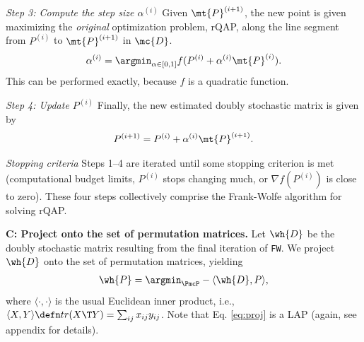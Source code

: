 \documentclass[11pt]{article}
\begin{document}

\emph{Step 3: Compute the step size $\alpha^{(i)}$} Given $\mt{P}^{(i+1)}$, the new point is given maximizing the \emph{original} optimization problem, rQAP, along the line segment from $P^{(i)}$ to $\mt{P}^{(i+1)}$ in $\mc{D}$.    
% 
% 
% 
\begin{align}\label{eq:step}
	\alpha^{(i)} = \argmin_{\alpha \in [0,1]} f(P^{(i)} + \alpha^{(i)} \mt{P}^{(i)}).
\end{align}
This can be performed exactly, because $f$ is a quadratic function.  


\emph{Step 4: Update $P^{(i)}$} Finally, the new estimated doubly stochastic matrix is given by
\begin{align}\label{eq:update}
	P^{(i+1)} = P^{(i)} + \alpha^{(i)} \mt{P}^{(i+1)}.
\end{align}


\emph{Stopping criteria} Steps 1--4 are iterated until some stopping criterion is met (computational budget limits, $P^{(i)}$ stops changing much, or $\nabla f(P^{(i)})$ is close to zero).  These four steps collectively comprise the Frank-Wolfe algorithm for solving rQAP.  %


\textbf{C: Project onto the set of permutation matrices.}   Let $\wh{D}$ be the doubly stochastic matrix resulting from the final iteration of \texttt{FW}.  We project $\wh{D}$ onto the set of permutation matrices, yielding
\begin{align} \label{eq:proj}
	\wh{P} = \argmin_{\PmcP} -\langle \wh{D}, P \rangle,
\end{align}
where $\langle \cdot,\cdot \rangle$ %
is the usual Euclidean inner product, i.e., $\langle X,Y\rangle \defn tr(X\T Y)= \sum_{ij} x_{ij} y_{ij}$.  Note that Eq. \eqref{eq:proj} is a LAP (again, see appendix for details).
\end{document}

